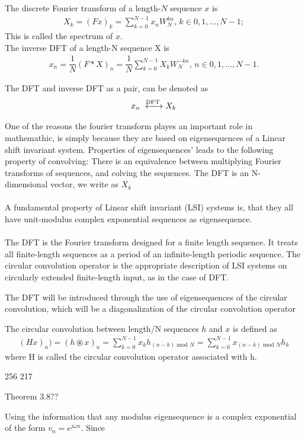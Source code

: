 \begin{definition}
The discrete Fourier transform of a length-$N$ sequence $x$ is 
\begin{align*}
	X_k = (Fx)_k = \sum_{k=0}^{N-1} x_n W_N^{kn}, \, k\in {0, 1, \dots, N-1};
\end{align*}
This is called the spectrum of $x$.\\
The inverse DFT of a length-N sequence X is
\begin{align*}
	x_n = \dfrac{1}{N}(F*X)_n = \dfrac{1}{N}\sum_{k=0}^{N-1} X_k W_N^{-kn}, \, n \in {0, 1, \dots, N-1}.
\end{align*}

The DFT and inverse DFT as a pair, can be denoted as 
\begin{align*}
	x_n \xleftrightarrow{\text{DFT}} X_k
\end{align*}
\end{definition} 
\cite{FSP}

One of the reasons the fourier transform playes an important role in mathemathic, is simply because they are based on eigensequences of a Linear shift invariant system. 
 Properties of eigensequences' leads to the following property of convolving:
There is an equivalence between multiplying Fourier transforms of sequences, and colving the sequences.
 The DFT is an N-dimensional vector, we write as $X_k$
\\\\
 A fundamental property of Linear shift invariant (LSI) systems is, that they all have unit-modulus complex exponential sequences as eigensequence. \cite{FSP}
\\\\
The DFT is the Fourier transform designed for a finite length sequence.
It treats all finite-length sequences as a period of an infinite-length periodic sequence.
The circular convolution operator is the appropriate description of LSI systems on circularly extended finite-length input, as in the case of DFT.  

The DFT will be introduced through the use of eigensequences of the circular convolution, which will be a diagonalization of the circular convolution operator

\begin{definition}
 	The circular convolution between length/N sequences $h$ and $x$ is defined as
\begin{align*}
	(Hx)_n) = (h \circledast x)_n = \sum_{k = 0}^{N-1} x_k h_{(n-k) \text{ mod $N$}} =\sum_{k = 0}^{N-1} x_{(n-k) \text{ mod $N$}} h_k
\end{align*}
where H is called the circular convolution operator associated with h.
\end{definition} \cite{FSP}

256 217

Theorem 3.8??

Using the information that any modulus eigensequence is a complex exponential of the form $v_n = e^{j\omega n}$.
Since 
